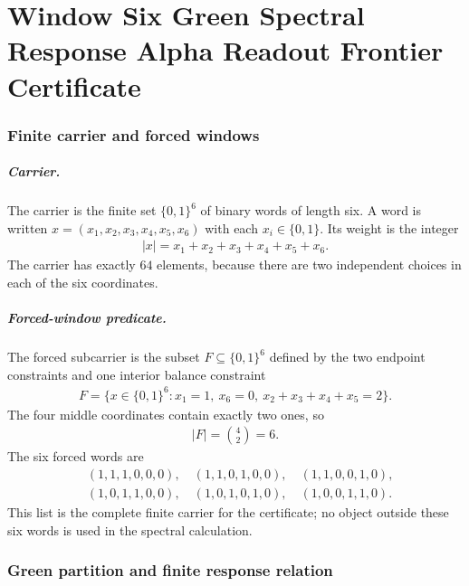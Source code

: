 \chapter{Window Six Green Spectral Response Alpha Readout Frontier Certificate}\label{ch:window6-green-spectral-response-alpha-readout-frontier-certificate}

\subsection{Finite carrier and forced windows}\label{sec:window6-green-carrier}

\paragraph{Carrier.}
The carrier is the finite set $\{0,1\}^6$ of binary words of length six.  A word is written $x=(x_1,x_2,x_3,x_4,x_5,x_6)$ with each $x_i\in\{0,1\}$.  Its weight is the integer
$$\begin{aligned}
|x|=x_1+x_2+x_3+x_4+x_5+x_6 .
\end{aligned}$$
The carrier has exactly $64$ elements, because there are two independent choices in each of the six coordinates.

\paragraph{Forced-window predicate.}
The forced subcarrier is the subset $F\subseteq \{0,1\}^6$ defined by the two endpoint constraints and one interior balance constraint
$$\begin{aligned}
F=\{x\in\{0,1\}^6 : x_1=1,\ x_6=0,\ x_2+x_3+x_4+x_5=2\} .
\end{aligned}$$
The four middle coordinates contain exactly two ones, so
$$\begin{aligned}
|F|={4\choose 2}=6 .
\end{aligned}$$
The six forced words are
$$\begin{aligned}
&(1,1,1,0,0,0),\quad (1,1,0,1,0,0),\quad (1,1,0,0,1,0),\\
&(1,0,1,1,0,0),\quad (1,0,1,0,1,0),\quad (1,0,0,1,1,0).
\end{aligned}$$
This list is the complete finite carrier for the certificate; no object outside these six words is used in the spectral calculation.

\subsection{Green partition and finite response relation}\label{sec:window6-green-partition}

